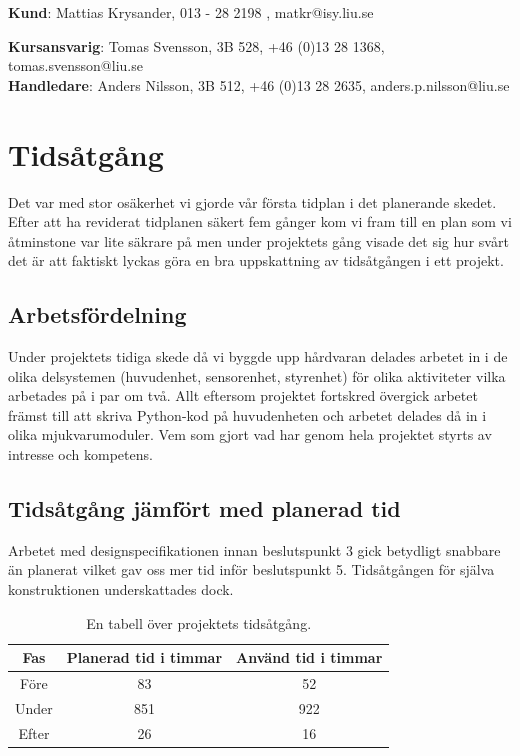 \documentclass{article}
\begin{document}
\begin{center}
\textbf{Kund}: Mattias Krysander, 013 - 28 2198 , matkr@isy.liu.se
\end{center}

\begin{center}
\textbf{Kursansvarig}: Tomas Svensson, 3B 528, +46 (0)13 28 1368, tomas.svensson@liu.se \\
\textbf{Handledare}: Anders Nilsson, 3B 512, +46 (0)13 28 2635, anders.p.nilsson@liu.se
\end{center}
\vspace*{\fill}
\clearpage

\renewcommand*\contentsname{Innehållsförteckning}
\tableofcontents

\clearpage
\section{Tidsåtgång}
Det var med stor osäkerhet vi gjorde vår första tidplan i det planerande skedet. Efter att ha reviderat tidplanen säkert fem gånger kom vi fram till en plan som vi åtminstone var lite säkrare på men under projektets gång visade det sig hur svårt det är att faktiskt lyckas göra en bra uppskattning av tidsåtgången i ett projekt.

\subsection{Arbetsfördelning}
Under projektets tidiga skede då vi byggde upp hårdvaran delades arbetet in i de olika delsystemen (huvudenhet, sensorenhet, styrenhet) för olika aktiviteter vilka arbetades på i par om två. Allt eftersom projektet fortskred övergick arbetet främst till att skriva Python-kod på huvudenheten och arbetet delades då in i olika mjukvarumoduler. Vem som gjort vad har genom hela projektet styrts av intresse och kompetens.

\subsection{Tidsåtgång jämfört med planerad tid}
Arbetet med designspecifikationen innan beslutspunkt 3 gick betydligt snabbare än planerat vilket gav oss mer tid inför beslutspunkt 5. Tidsåtgången för själva konstruktionen underskattades dock.

\begin{table}[H]
\centering
\caption{En tabell över projektets tidsåtgång.}
\begin{tabular}{ | c | c | c | }
\hline
Fas & Planerad tid i timmar & Använd tid i timmar \\
\hline
Före & 83 & 52 \\
\hline
Under & 851 & 922 \\
\hline
Efter & 26 & 16 \\
\hline
\end{tabular}
\label{table:tidsatgang}
\end{table}
\ \\
\end{document}
